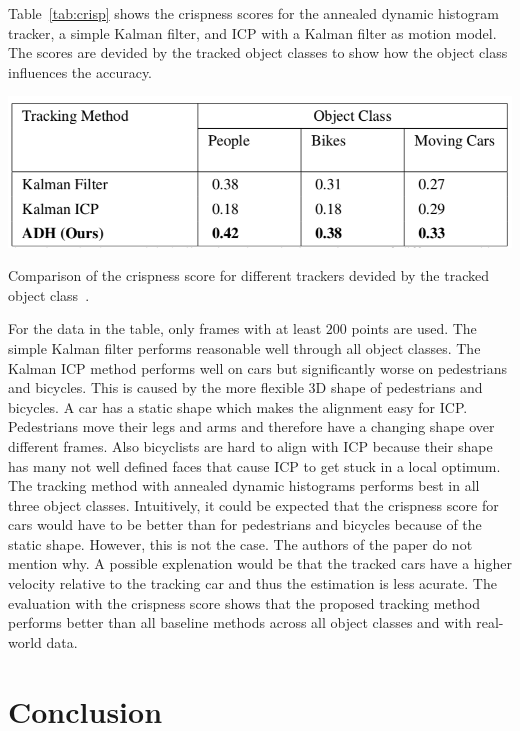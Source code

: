 \documentclass[twoside,a4paper,article]{combine}
\begin{document}
Table~\ref{tab:crisp} shows the crispness scores for the annealed
dynamic histogram tracker, a simple Kalman filter, and ICP with a
Kalman filter as motion model. The scores are devided by the tracked
object classes to show how the object class influences the accuracy.
\begin{table}
  \center
  \includegraphics[width=.8\linewidth]{crispness-scores}
  \caption{Comparison of the crispness score for different trackers
    devided by the tracked object class~\cite{paper}.}
  \label{tab:crisp}
\end{table}
For the data in the table, only frames with at least $200$ points are
used. The simple Kalman filter performs reasonable well through all
object classes. The Kalman ICP method performs well on cars but
significantly worse on pedestrians and bicycles. This is caused by the
more flexible 3D shape of pedestrians and bicycles. A car has a static
shape which makes the alignment easy for ICP. Pedestrians move their
legs and arms and therefore have a changing shape over different
frames. Also bicyclists are hard to align with ICP because their shape
has many not well defined faces that cause ICP to get stuck in a local
optimum. The tracking method with annealed dynamic histograms performs
best in all three object classes. Intuitively, it could be expected
that the crispness score for cars would have to be better than for
pedestrians and bicycles because of the static shape. However, this is
not the case. The authors of the paper do not mention why. A possible
explenation would be that the tracked cars have a higher velocity
relative to the tracking car and thus the estimation is less acurate.
The evaluation with the crispness score shows that the proposed
tracking method performs better than all baseline methods across all
object classes and with real-world data.


\section{Conclusion}
\label{sec:conclusion}





\end{document}
